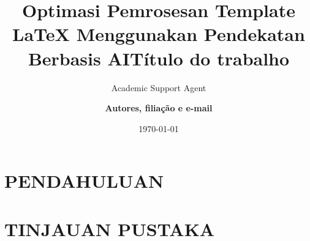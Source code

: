 \documentclass{beamer}
\title{Optimasi Pemrosesan Template LaTeX Menggunakan Pendekatan Berbasis AI}
\author{Academic Support Agent}
\date{\today}
\begin{document}
\maketitle

\begin{abstract}

\end{abstract}

\chapter{PENDAHULUAN}


\chapter{TINJAUAN PUSTAKA}



\title[]{
{\fontsize{28pt}{30}\selectfont\textbf{Título do trabalho}}}
\author{
{\fontsize{18pt}{20}\selectfont \textbf{
Autores, filiação e e-mail
}}}



\end{document}
